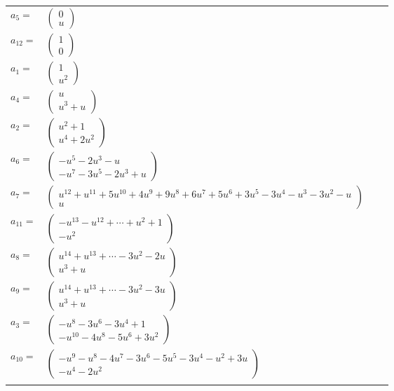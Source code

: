 \documentclass[1p]{elsarticle_modified}
\theoremstyle{definition}
\begin{document}
\begin{tabular}{m{7pt} m{180pt} m{7pt} m{180pt} }
\flushright $a_{5}=$&$\begin{pmatrix}0\\u\end{pmatrix}$ \\
\flushright $a_{12}=$&$\begin{pmatrix}1\\0\end{pmatrix}$ \\
\flushright $a_{1}=$&$\begin{pmatrix}1\\u^2\end{pmatrix}$ \\
\flushright $a_{4}=$&$\begin{pmatrix}u\\u^3+u\end{pmatrix}$ \\
\flushright $a_{2}=$&$\begin{pmatrix}u^2+1\\u^4+2 u^2\end{pmatrix}$ \\
\flushright $a_{6}=$&$\begin{pmatrix}- u^5-2 u^3- u\\- u^7-3 u^5-2 u^3+u\end{pmatrix}$ \\
\flushright $a_{7}=$&$\begin{pmatrix}u^{12}+u^{11}+5 u^{10}+4 u^9+9 u^8+6 u^7+5 u^6+3 u^5-3 u^4- u^3-3 u^2- u\\u\end{pmatrix}$ \\
\flushright $a_{11}=$&$\begin{pmatrix}- u^{13}- u^{12}+\cdots+u^2+1\\- u^2\end{pmatrix}$ \\
\flushright $a_{8}=$&$\begin{pmatrix}u^{14}+u^{13}+\cdots-3 u^2-2 u\\u^3+u\end{pmatrix}$ \\
\flushright $a_{9}=$&$\begin{pmatrix}u^{14}+u^{13}+\cdots-3 u^2-3 u\\u^3+u\end{pmatrix}$ \\
\flushright $a_{3}=$&$\begin{pmatrix}- u^8-3 u^6-3 u^4+1\\- u^{10}-4 u^8-5 u^6+3 u^2\end{pmatrix}$ \\
\flushright $a_{10}=$&$\begin{pmatrix}- u^9- u^8-4 u^7-3 u^6-5 u^5-3 u^4- u^2+3 u\\- u^4-2 u^2\end{pmatrix}$\\&\end{tabular}
\end{document}
